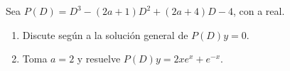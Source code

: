 Sea \(P(D)=D^3-(2a+1)D^2+(2a+4)D-4\), con a real.

\begin{enumerate}[label=(\alph*),ref=\alph*,leftmargin=*]
\item Discute según a la solución general de \(P(D)y=0\).
\item Toma \(a=2\) y resuelve \(P(D)y=2xe^x+e^{-x}\).
\end{enumerate}
